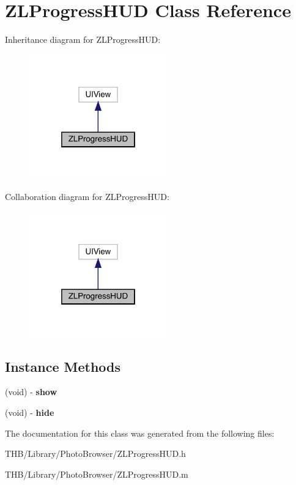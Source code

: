 \hypertarget{interface_z_l_progress_h_u_d}{}\section{Z\+L\+Progress\+H\+UD Class Reference}
\label{interface_z_l_progress_h_u_d}


Inheritance diagram for Z\+L\+Progress\+H\+UD\+:\nopagebreak
\begin{figure}[H]
\begin{center}
\leavevmode
\includegraphics[width=169pt]{interface_z_l_progress_h_u_d__inherit__graph}
\end{center}
\end{figure}


Collaboration diagram for Z\+L\+Progress\+H\+UD\+:\nopagebreak
\begin{figure}[H]
\begin{center}
\leavevmode
\includegraphics[width=169pt]{interface_z_l_progress_h_u_d__coll__graph}
\end{center}
\end{figure}
\subsection*{Instance Methods}
\begin{DoxyCompactItemize}
\item 
\mbox{\label{interface_z_l_progress_h_u_d_ad3caf6877b934c7a18cd38d2c6af468f}} 
(void) -\/ {\bfseries show}
\item 
\mbox{\label{interface_z_l_progress_h_u_d_a7338e67ab9526c646bd0a1ecf0de18c6}} 
(void) -\/ {\bfseries hide}
\end{DoxyCompactItemize}


The documentation for this class was generated from the following files\+:\begin{DoxyCompactItemize}
\item 
T\+H\+B/\+Library/\+Photo\+Browser/Z\+L\+Progress\+H\+U\+D.\+h\item 
T\+H\+B/\+Library/\+Photo\+Browser/Z\+L\+Progress\+H\+U\+D.\+m\end{DoxyCompactItemize}

